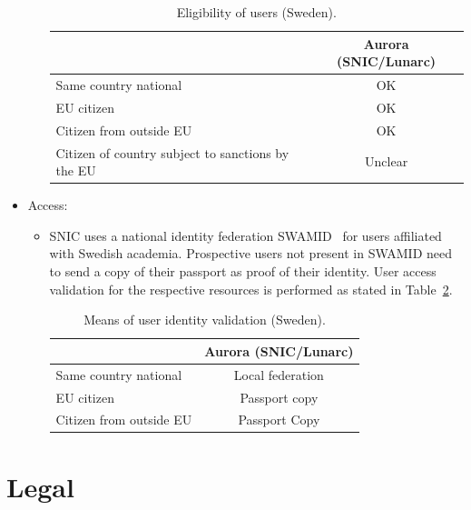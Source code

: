 \documentclass{article}
\begin{document}
\begin{itemize}
\begin{itemize}
\begin{table}[!h]
\begin{tabular}{|l|c|}
    & Aurora (SNIC/Lunarc)  \\
    \hline
  Same country national      & OK  \\
    \hline
    EU citizen       &  OK \\
        \hline
        Citizen from outside EU & OK \\
        \hline
        Citizen of country subject to sanctions by the EU  & Unclear \\
        \hline
        \end{tabular}
    \caption{Eligibility of users (Sweden).}
    \label{tab:SE_user_elegibility}
\end{table}

\end{itemize} 

\item[]Access:
\begin{itemize} 
\item[] SNIC uses a national identity federation SWAMID~\cite{swamid} for users affiliated with Swedish academia. 
Prospective users not present in SWAMID need to send a copy of their passport as proof of their identity. 
User access validation for the respective resources is performed as stated in Table~\ref{tab:SE_user_acc_val}.

\begin{table}[!h]
    \centering
    \begin{tabular}{|l|c|}
        \hline
    
    & Aurora (SNIC/Lunarc)  \\
    \hline
  Same country national      & Local federation  \\
    \hline
    EU citizen       &  Passport copy \\
        \hline
        Citizen from outside EU & Passport Copy \\
        \hline
        \end{tabular}
    \caption{Means of user identity validation (Sweden).}
    \label{tab:SE_user_acc_val}
\end{table}
\end{itemize} 

\end{itemize} 

\section{Legal} 
\end{document}
